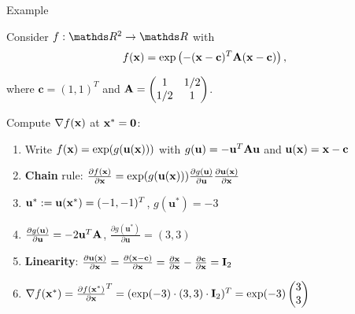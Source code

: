 \documentclass[11pt,compress,t,notes=noshow, xcolor=table]{beamer}
\begin{document}
\begin{vbframe}{Example}

Consider $f : \R^2 \to \R$ with
\begin{equation*}
    f(\mathbf{x}) = \exp\left(-(\mathbf{x} - \mathbf{c})^T \mathbf{A} (\mathbf{x} - \mathbf{c})\right),
\end{equation*}

\vspace{-0.5\baselineskip}

where $\mathbf{c} = (1, 1)^T$ and $\mathbf{A} = \begin{pmatrix}1 & 1/2 \\ 1/2 & 1\end{pmatrix}$.

\medskip

Compute $\nabla f(\mathbf{x})$ at $\mathbf{x}^\ast = \mathbf{0}$:

\medskip

\begin{enumerate}
    \item Write $f(\mathbf{x}) = \exp(g(\mathbf{u}(\mathbf{x})))$ with $g(\mathbf{u}) = -\mathbf{u}^T\mathbf{A}\mathbf{u}$ and $\mathbf{u}(\mathbf{x}) = \mathbf{x}-\mathbf{c}$
    \item \textbf{Chain} rule: $\frac{\partial f(\mathbf{x})}{\partial\mathbf{x}} = \exp(g(\mathbf{u}(\mathbf{x}))) \frac{\partial g(\mathbf{u})}{\partial\mathbf{u}} \frac{\partial\mathbf{u}(\mathbf{x})}{\partial\mathbf{x}}$
    \item $\mathbf{u}^\ast := \mathbf{u}(\mathbf{x}^\ast) = (-1,-1)^T$, $g(\mathbf{u^\ast}) = -3$
    \item $\frac{\partial g(\mathbf{u})}{\partial\mathbf{u}} = -2\mathbf{u}^T\mathbf{A}$, $\frac{\partial g(\mathbf{u}^\ast)}{\partial\mathbf{u}} = (3, 3)$
    \item \textbf{Linearity}: $\frac{\partial\mathbf{u}(\mathbf{x})}{\partial\mathbf{x}} = \frac{\partial(\mathbf{x} - \mathbf{c})}{\partial\mathbf{x}} = \frac{\partial\mathbf{x}}{\partial\mathbf{x}} - \frac{\partial\mathbf{c}}{\partial\mathbf{x}} = \mathbf{I}_2$
    \item $\nabla f(\mathbf{x}^\ast) = \frac{\partial f(\mathbf{x}^\ast)}{\partial{\mathbf{x}}}^T = (\exp(-3) \cdot (3, 3) \cdot \mathbf{I}_2)^T = \exp(-3) \begin{pmatrix}3 \\ 3\end{pmatrix}$
\end{enumerate}

\end{vbframe}

\endlecture
\end{document}
